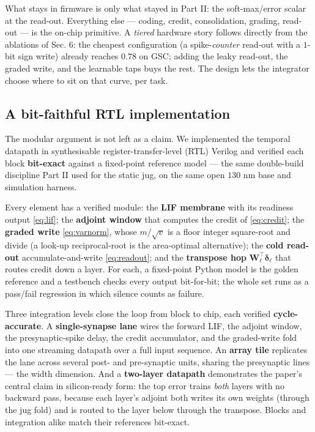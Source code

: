 \documentclass[11pt]{article}
\begin{document}
What stays in firmware is only what stayed in Part II: the
soft-max/error scalar at the read-out. Everything else --- coding,
credit, consolidation, grading, read-out --- is the on-chip primitive. A
\emph{tiered} hardware story follows directly from the ablations of Sec.
6: the cheapest configuration (a spike-\emph{counter} read-out with a
\(1\)-bit sign write) already reaches \(0.78\) on GSC; adding the leaky
read-out, the graded write, and the learnable taps buys the rest. The
design lets the integrator choose where to sit on that curve, per task.

\hypertarget{sec:rtl}{%
\subsection{A bit-faithful RTL implementation}\label{sec:rtl}}

The modular argument is not left as a claim. We implemented the temporal
datapath in synthesisable register-transfer-level (RTL) Verilog and
verified each block \textbf{bit-exact} against a fixed-point reference
model --- the same double-build discipline Part II used for the static
jug, on the same open \(130\) nm base and simulation harness.

Every element has a verified module: the \textbf{LIF membrane} with its
readiness output \eqref{eq:lif}; the \textbf{adjoint window} that
computes the credit of \eqref{eq:credit}; the \textbf{graded write}
\eqref{eq:varnorm}, whose \(m/\sqrt{v}\) is a floor integer square-root
and divide (a look-up reciprocal-root is the area-optimal alternative);
the \textbf{cold read-out} accumulate-and-write \eqref{eq:readout}; and
the \textbf{transpose hop} \(\bm W_\ell^{\!\top}\bm\delta_\ell\) that
routes credit down a layer. For each, a fixed-point Python model is the
golden reference and a testbench checks every output bit-for-bit; the
whole set runs as a pass/fail regression in which silence counts as
failure.

Three integration levels close the loop from block to chip, each
verified \textbf{cycle-accurate}. A \textbf{single-synapse lane} wires
the forward LIF, the adjoint window, the presynaptic-spike delay, the
credit accumulator, and the graded-write fold into one streaming
datapath over a full input sequence. An \textbf{array tile} replicates
the lane across several post- and pre-synaptic units, sharing the
presynaptic lines --- the width dimension. And a \textbf{two-layer
datapath} demonstrates the paper's central claim in silicon-ready form:
the top error trains \emph{both} layers with no backward pass, because
each layer's adjoint both writes its own weights (through the jug fold)
and is routed to the layer below through the transpose. Blocks and
integration alike match their references bit-exact.
\end{document}
